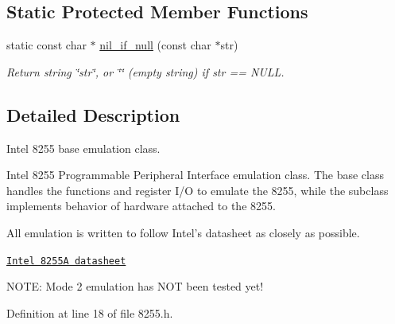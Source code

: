 \subsection*{Static Protected Member Functions}
\begin{DoxyCompactItemize}
\item 
\hypertarget{classIntel8255_a4d14f0770973a9e416acc5ac04857eb1}{static const char $\ast$ \hyperlink{classIntel8255_a4d14f0770973a9e416acc5ac04857eb1}{nil\-\_\-if\-\_\-null} (const char $\ast$str)}\label{classIntel8255_a4d14f0770973a9e416acc5ac04857eb1}

\begin{DoxyCompactList}\small\item\em Return string \char`\"{}str\char`\"{}, or \char`\"{}\char`\"{} (empty string) if str == N\-U\-L\-L. \end{DoxyCompactList}\end{DoxyCompactItemize}


\subsection{Detailed Description}
Intel 8255 base emulation class. 

Intel 8255 Programmable Peripheral Interface emulation class. The base class handles the functions and register I/\-O to emulate the 8255, while the subclass implements behavior of hardware attached to the 8255.

All emulation is written to follow Intel's datasheet as closely as possible.

\href{http://hackipedia.org/browse/Hardware/By%20company/Intel/8255,%20Programmable%20Peripheral%20Interface/8255A,%208255A-5%20Programmable%20Peripheral%20Interface%20(1991-08).pdf}{\tt Intel 8255\-A datasheet}

N\-O\-T\-E\-: Mode 2 emulation has N\-O\-T been tested yet! 

Definition at line 18 of file 8255.\-h.



